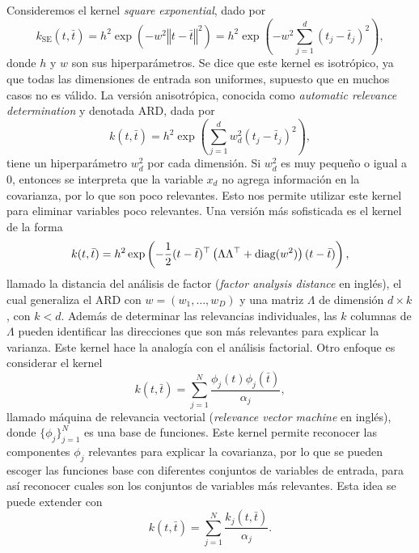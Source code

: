 Consideremos el kernel \emph{square exponential}, dado por
\begin{equation*}
	k_{\mathrm{SE}} (t, \bar{t}) = h^2 \exp\left(-w^2 \left\Vert t - \bar{t} \right\Vert^2\right) = h^2 \exp\left(-w^2 \sum_{j=1}^{d} \left(t_j - \bar{t}_j\right)^2\right),
\end{equation*}
donde \(h\) y \(w\) son sus hiperparámetros. Se dice que este kernel es isotrópico, ya que todas las dimensiones de entrada son uniformes, supuesto que en muchos casos no es válido. La versión anisotrópica, conocida como \emph{automatic relevance determination} y denotada ARD, dada por
\begin{equation*}
	k(t, \bar{t}) = h^2 \exp\left(\sum_{j=1}^{d} w_d^2 (t_j - \bar{t}_j)^2\right),
\end{equation*}
tiene un hiperparámetro \(w_d^2\) por cada dimensión. Si \(w_d^2\) es muy pequeño o igual a \(0\), entonces se interpreta que la variable \(x_d\) no agrega información en la covarianza, por lo que son poco relevantes. Esto nos permite utilizar este kernel para eliminar variables poco relevantes. Una versión más sofisticada es el kernel de la forma
\begin{equation*}
	k(t, \bar{t}) = h^2 \exp\left(-\frac{1}{2} (t - \bar{t})^{\top} \left(\Lambda \Lambda^{\top} + \operatorname{diag}(w^2)\right) (t - \bar{t}) \right),
\end{equation*}
llamado la distancia del análisis de factor (\emph{factor analysis distance} en inglés), el cual generaliza el ARD con \(w = (w_1, \dotsc, w_D)\) y una matriz \(\Lambda\) de dimensión \(d \times k\), con \(k < d\). Además de determinar las relevancias individuales, las \(k\) columnas de \(\Lambda\) pueden identificar las direcciones que son más relevantes para explicar la varianza. Este kernel hace la analogía con el análisis factorial. Otro enfoque es considerar el kernel
\begin{equation*}
	k(t, \bar{t}) = \sum_{j=1}^{N} \frac{\phi_j(t) \phi_j(\bar{t})}{\alpha_j},
\end{equation*}
llamado máquina de relevancia vectorial (\emph{relevance vector machine} en inglés), donde \(\{\phi_j\}_{j=1}^{N}\) es una base de funciones. Este kernel permite reconocer las componentes \(\phi_j\) relevantes para explicar la covarianza, por lo que se pueden escoger las funciones base con diferentes conjuntos de variables de entrada, para así reconocer cuales son los conjuntos de variables más relevantes. Esta idea se puede extender con
\[k (t, \bar{t}) = \sum_{j=1}^{N} \frac{k_j(t, \bar{t})}{\alpha_j}.\]